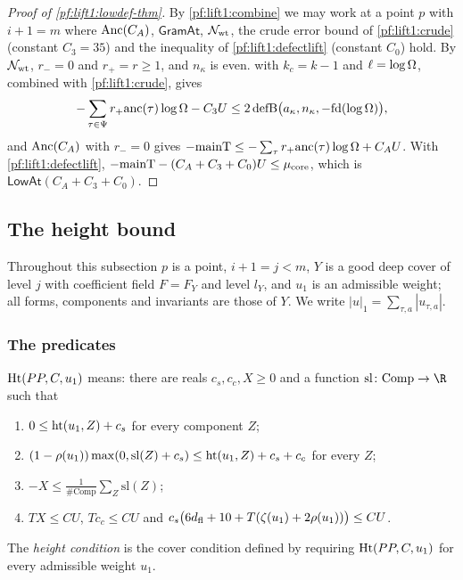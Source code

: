 \begin{proof}[Proof of \cref{pf:lift1:lowdef-thm}]
By \cref{pf:lift1:combine} we may work at a point $p$ with $i+1=m$ where $\mathrm{Anc}(C_A)$,
$\mathsf{GramAt}$, $\mathcal N_{\mathrm{wt}}$, the crude error bound of \cref{pf:lift1:crude} (constant $C_3=35$)
and the inequality of \cref{pf:lift1:defectlift} (constant $C_0$) hold. By $\mathcal N_{\mathrm{wt}}$, $r_-=0$
and $r_+=r\ge1$, and $n_\kappa$ is even.  with $k_c=k-1$ and
$\ell=\log\Omega$, combined with \cref{pf:lift1:crude}, gives
\[
-\sum_{\tau\in\Psi}r_+\mathrm{anc}(\tau)\log\Omega-C_3U\le2\,\mathrm{defB}\bigl(a_\kappa,n_\kappa,-\mathrm{fd}(\log\Omega)\bigr),
\]
and $\mathrm{Anc}(C_A)$ with $r_-=0$ gives
$-\mathrm{mainT}\le-\sum_\tau r_+\mathrm{anc}(\tau)\log\Omega+C_AU$. With \cref{pf:lift1:defectlift},
$-\mathrm{mainT}-(C_A+C_3+C_0)U\le\mu_{\mathrm{core}}$, which is $\mathsf{LowAt}(C_A+C_3+C_0)$.
\end{proof}

\subsection{The height bound}\label{pf:lift1:height}

Throughout this subsection $p$ is a point, $i+1=j<m$, $Y$ is a good deep cover of level $j$ with
coefficient field $F=F_Y$ and level $l_Y$, and $u_1$ is an admissible weight; all forms, components and
invariants are those of $Y$. We write $|u|_1=\sum_{\tau,a}|u_{\tau,a}|$.

\subsubsection*{The predicates}
\begin{definition}\label{pf:lift1:heightat}
$\mathrm{Ht}(PP,C,u_1)$ means: there are reals $c_s,c_c,X\ge0$ and a function
$\mathrm{sl}\colon\mathrm{Comp}\to\R$ such that
\begin{enumerate}[label=(H\arabic*)]
\item\label{pf:lift1:H1} $0\le\mathrm{ht}(u_1,Z)+c_s$ for every component $Z$;
\item\label{pf:lift1:H2} $(1-\rho(u_1))\max(0,\mathrm{sl}(Z)+c_s)\le\mathrm{ht}(u_1,Z)+c_s+c_c$ for every $Z$;
\item\label{pf:lift1:H3} $-X\le\frac1{\#\mathrm{Comp}}\sum_Z\mathrm{sl}(Z)$;
\item\label{pf:lift1:H4} $TX\le CU$, $Tc_c\le CU$ and
  $c_s\bigl(6d_{\mathrm{fl}}+10+T(\zeta(u_1)+2\rho(u_1))\bigr)\le CU$.
\end{enumerate}
The \emph{height condition} is the cover condition defined by requiring $\mathrm{Ht}(PP,C,u_1)$ for
every admissible weight $u_1$.
\end{definition}

